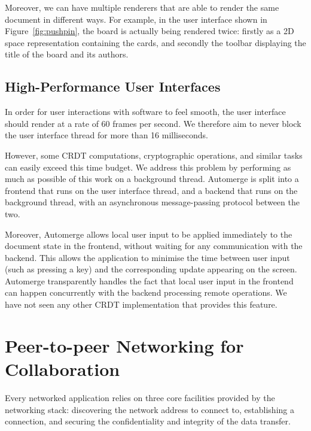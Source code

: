 \documentclass[sigplan,10pt]{acmart}
\begin{document}
Moreover, we can have multiple renderers that are able to render the same document in different ways.
For example, in the user interface shown in Figure~\ref{fig:pushpin}, the board is actually being rendered twice: firstly as a 2D space representation containing the cards, and secondly the toolbar displaying the title of the board and its authors.

\subsection{High-Performance User Interfaces}

In order for user interactions with software to feel smooth, the user interface should render at a rate of 60 frames per second.
We therefore aim to never block the user interface thread for more than 16 milliseconds.

However, some CRDT computations, cryptographic operations, and similar tasks can easily exceed this time budget.
We address this problem by performing as much as possible of this work on a background thread.
Automerge is split into a frontend that runs on the user interface thread, and a backend that runs on the background thread, with an asynchronous message-passing protocol between the two.

Moreover, Automerge allows local user input to be applied immediately to the document state in the frontend, without waiting for any communication with the backend.
This allows the application to minimise the time between user input (such as pressing a key) and the corresponding update appearing on the screen.
Automerge transparently handles the fact that local user input in the frontend can happen concurrently with the backend processing remote operations.
We have not seen any other CRDT implementation that provides this feature.


\section{Peer-to-peer Networking for Collaboration}\label{sec:networking}

Every networked application relies on three core facilities provided by the networking stack: discovering the network address to connect to, establishing a connection, and securing the confidentiality and integrity of the data transfer.
\end{document}
